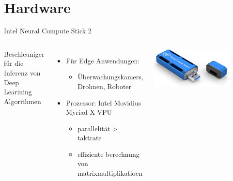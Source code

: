\section[\thesection \  Hardware]{Hardware}\label{sec:hardware}

\begin{frame}{Intel Neural Compute Stick 2}
    \begin{columns}[T]
        Beschleuniger für die Inferenz von Deep Learining Algorithmen
        \begin{itemize}
            \item Für Edge Anwendungen:
            \begin{itemize}
                \item Überwachungskamers, Drohnen, Roboter
            \end{itemize}
            \item Prozessor: Intel Movidius Myriad X VPU
            \begin{itemize}
                \item parallelität > taktrate
                \item effiziente berechnung von matrixmultiplikatioen
            \end{itemize}
        \end{itemize}
        \vspace{1cm}
        \includegraphics[width=0.8\textwidth]{Bilder/ncs2.jpg}
    \end{columns}
    \vspace{0.3cm}

\end{frame}
